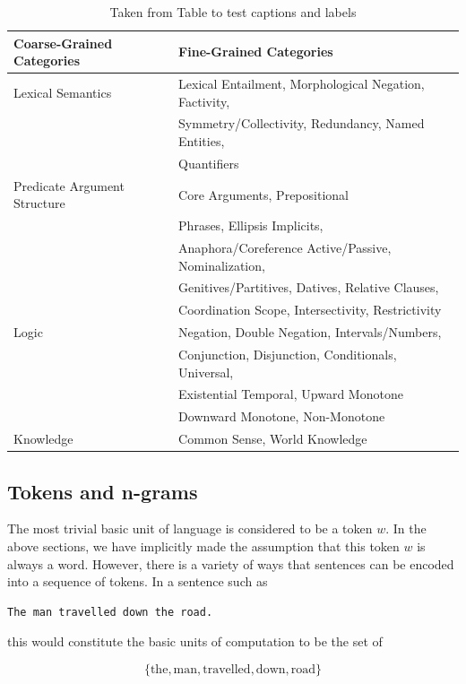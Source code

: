 \documentclass[a4paper,12pt,twoside,openright]{report}
\begin{document}
\begin{table}[h!]
\centering
\begin{tabular}{l l} 
 \hline
 Coarse-Grained Categories & Fine-Grained Categories \\ [0.5ex] 
 \hline
 Lexical Semantics & Lexical Entailment, Morphological Negation, Factivity, \\
&  Symmetry/Collectivity, Redundancy, Named Entities, \\
& Quantifiers \\ 
Predicate Argument Structure & Core Arguments, Prepositional \\ & Phrases, Ellipsis \/ Implicits, \\
& Anaphora/Coreference Active/Passive, Nominalization, \\
& Genitives/Partitives, Datives, Relative Clauses, \\
& Coordination Scope, Intersectivity, Restrictivity \\
Logic & Negation, Double Negation, Intervals/Numbers, \\
& Conjunction, Disjunction, Conditionals, Universal, \\
& Existential Temporal, Upward Monotone \\
& Downward Monotone, Non-Monotone \\
Knowledge & Common Sense, World Knowledge \\ [1ex] 
\hline
\end{tabular}
\caption{Taken from \cite{wang19} Table to test captions and labels}
\label{table:1}
\end{table}


\subsection{Tokens and n-grams}

The most trivial basic unit of language is considered to be a token $w$.
In the above sections, we have implicitly made the assumption that this token $w$ is always a word. 
However, there is a variety of ways that sentences can be encoded into a sequence of tokens.
In a sentence such as

\begin{verbatim}
The man travelled down the road.
\end{verbatim}\label{sentence:man_travelled}

this would constitute the basic units of computation to be the set of 

$$
\{ \text{the}, \text{man}, \text{travelled}, \text{down}, \text{road} \}
$$
\end{document}

